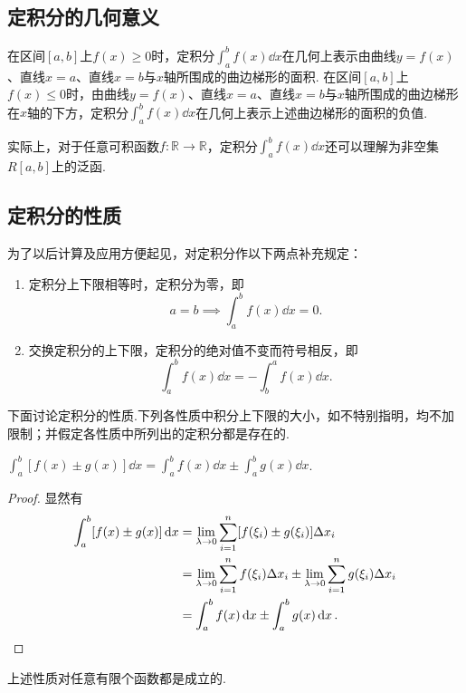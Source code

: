 \subsection{定积分的几何意义}
在区间\([a,b]\)上\(f(x) \geq 0\)时，定积分\(\int_a^b f(x) \dd{x}\)在几何上表示由曲线\(y=f(x)\)、直线\(x=a\)、直线\(x=b\)与\(x\)轴所围成的曲边梯形的面积.
在区间\([a,b]\)上\(f(x) \leq 0\)时，由曲线\(y=f(x)\)、直线\(x=a\)、直线\(x=b\)与\(x\)轴所围成的曲边梯形在\(x\)轴的下方，定积分\(\int_a^b f(x) \dd{x}\)在几何上表示上述曲边梯形的面积的负值.

实际上，对于任意可积函数\(f\colon \mathbb{R} \to \mathbb{R}\)，定积分\(\int_a^b f(x) \dd{x}\)还可以理解为非空集\(R[a,b]\)上的泛函.

\subsection{定积分的性质}
\begin{definition}
为了以后计算及应用方便起见，对定积分作以下两点补充规定：
\begin{enumerate}
\item 定积分上下限相等时，定积分为零，即
\begin{equation}\label{equation:定积分.上下限相等的定积分为零}
    a=b \implies \int_a^b f(x) \dd{x}=0.
\end{equation}
\item 交换定积分的上下限，定积分的绝对值不变而符号相反，即
\begin{equation}\label{equation:定积分.交换上下限改变定积分的符号}
\int_a^b f(x) \dd{x}
= - \int_b^a f(x) \dd{x}.
\end{equation}
\end{enumerate}
\end{definition}

下面讨论定积分的性质.下列各性质中积分上下限的大小，如不特别指明，均不加限制；并假定各性质中所列出的定积分都是存在的.
\begin{property}\label{theorem:定积分.定积分性质1}
\(\int_a^b [f(x) \pm g(x)] \dd{x}
= \int_a^b f(x) \dd{x} \pm \int_a^b g(x) \dd{x}\).
\begin{proof}
显然有\[
\begin{split}
\int_a^b [f(x) \pm g(x)] \dd{x}
&= \lim\limits_{\lambda\to0} \sum\limits_{i=1}^n [f(\xi_i) \pm g(\xi_i)] \Delta x_i \\
&= \lim\limits_{\lambda\to0} \sum\limits_{i=1}^n f(\xi_i) \Delta x_i
	\pm \lim\limits_{\lambda\to0} \sum\limits_{i=1}^n g(\xi_i) \Delta x_i \\
&= \int_a^b f(x) \dd{x} \pm \int_a^b g(x) \dd{x}.
\qedhere
\end{split}
\]
\end{proof}
\end{property}
上述性质对任意有限个函数都是成立的.

